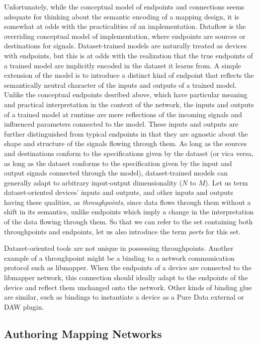 \documentclass[main.tex]{subfiles}
\begin{document}
Unfortunately, while the conceptual model of endpoints and connections seems
adequate for thinking about the semantic encoding of a mapping design, it is
somewhat at odds with the practicalities of an implementation. Dataflow is the
overriding conceptual model of implementation, where endpoints are sources or
destinations for signals. Dataset-trained models are naturally treated as
devices with endpoints, but this is at odds with the realization that the true
endpoints of a trained model are implicitly encoded in the dataset it learns
from. A simple extension of the model is to introduce a distinct kind of
endpoint that reflects the semantically neutral character of the inputs and
outputs of a trained model. Unlike the conceptual endpoints desribed above,
which have particular meaning and practical interpretation in the context of
the network, the inputs and outputs of a trained model at runtime are mere
reflections of the incoming signals and influenced parameters connected to the
model. These inputs and outputs are further distinguished from typical
endpoints in that they are agnostic about the shape and structure of the
signals flowing through them. As long as the sources and destinations conform
to the specifications given by the dataset (or vica versa, as long as the
dataset conforms to the specification given by the input and output signals
connected through the model), dataset-trained models can generally adapt to
arbitrary input-output dimensionality ($N$ to $M$). Let us term
dataset-oriented devices' inputs and outputs, and other inputs and outputs
having these qualities, as \emph{throughpoints}, since data flows through them
without a shift in its semantics, unlike endpoints which imply a change in the
interpretation of the data flowing through them. So that we can refer to the
set containing both throughpoints and endpoints, let us also introduce the term
\emph{ports} for this set.

Dataset-oriented tools are not unique in possessing throughpoints. Another
example of a throughpoint might be a binding to a network communication
protocol such as libmapper. When the endpoints of a device are connected to the
libmapper network, this connection should ideally adapt to the endpoints of the
device and reflect them unchanged onto the network. Other kinds of binding glue
are similar, such as bindings to instantiate a device as a Pure Data external
or DAW plugin.

\subsection{Authoring Mapping Networks}
\end{document}
